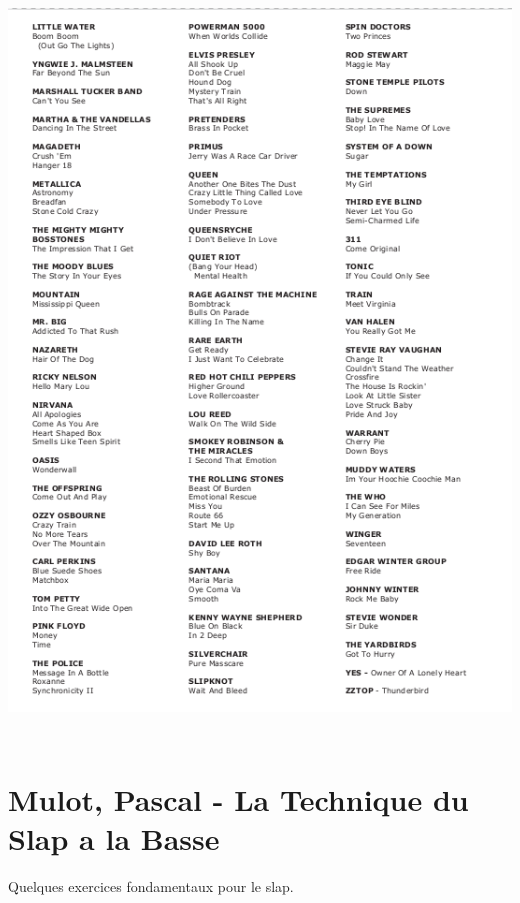 \documentclass[a4paper]{book}
\begin{document}
\begin{center}
\includegraphics[width=14.259cm,height=19.893cm]{lebluessupportsmethodes-img155.png}
\end{center}









\clearpage\section{Mulot, Pascal - La Technique du Slap a la Basse}
Quelques exercices fondamentaux pour le slap.
\end{document}
